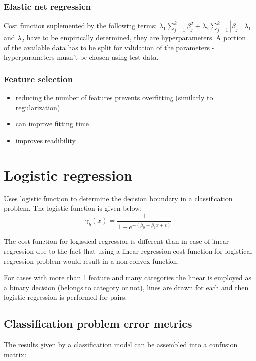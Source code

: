 \documentclass[11pt]{book}
\begin{document}
\subsubsection{Elastic net regression}

Cost function suplemented by the following terms: $\lambda_1 \sum_{j=1}^{k} \beta_j^2 + \lambda_2 \sum_{j=1}^{k} |\beta_j|$. $\lambda_1$ and $\lambda_2$ have to be empirically determined, they are hyperparameters. A portion of the available data has to be split for validation of the parameters - hyperparameters musn't be chosen using test data.

\subsubsection{Feature selection}
\begin{itemize}
    \item reducing the number of features prevents overfitting (similarly to regularization)
    \item can improve fitting time
    \item improves readibility
\end{itemize}

\section{Logistic regression}

Uses logistic function to determine the decision boundary in a classification problem. The logistic function is given below:
\begin{equation}
    \gamma_b(x) = \frac{1}{1 + e^{-(\beta_0 + \beta_1x + \epsilon)}}
\end{equation}

The cost function for logistical regression is different than in case of linear regression due to the fact that using a linear regression cost function for logistical regression problem would result in a non-convex function. 

For cases with more than 1 feature and many categories the linear is employed as a binary decision (belongs to category or not), lines are drawn for each and then logistic regression is performed for pairs. 

\subsection{Classification problem error metrics}

The results given by a classification model can be assembled into a confusion matrix:
\end{document}
